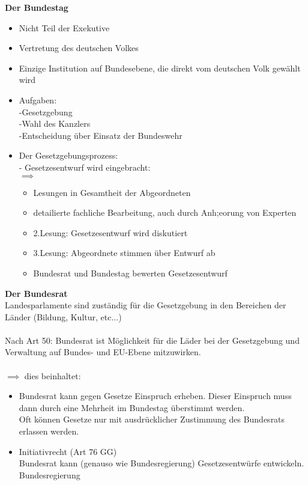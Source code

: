 \documentclass[12pt, letterpaper]{article}
\begin{document}
\begin{itemize}
\newpage
\textbf{Der Bundestag}
\begin{itemize}
  \item Nicht Teil der Exekutive
  \item Vertretung des deutschen Volkes
  \item Einzige Institution auf Bundesebene, die direkt vom deutschen Volk gewählt wird
  \item Aufgaben:\\
    -Gesetzgebung\\
    -Wahl des Kanzlers\\
    -Entscheidung über Einsatz der Bundeswehr\\

  \item Der Gesetzgebungsprozess:\\
    - Gesetzesentwurf wird eingebracht:\\
    $\implies$ \begin{itemize}
      \item Lesungen in Gesamtheit der Abgeordneten
      \item detailierte fachliche Bearbeitung, auch durch Anh;eorung von Experten
      \item 2.Lesung: Gesetzesentwurf wird diskutiert
      \item 3.Lesung: Abgeordnete stimmen über Entwurf ab
      \item Bundesrat und Bundestag bewerten Gesetzesentwurf
    \end{itemize}

\end{itemize}
\textbf{Der Bundesrat} 
\\
Landesparlamente sind zuständig für die Gesetzgebung in den Bereichen der Länder (Bildung, Kultur, etc...)
\\\\
Nach Art 50: Bundesrat ist Möglichkeit für die Läder bei der Gesetzgebung und Verwaltung auf Bundes- und EU-Ebene mitzuwirken.\\\\
$\implies$ dies beinhaltet: 
\begin{itemize}
  \item Bundesrat kann gegen Gesetze Einspruch erheben. Dieser Einspruch muss dann durch eine Mehrheit im Bundestag überstimmt werden.\\
    Oft können Gesetze nur mit ausdrücklicher Zustimmung des Bundesrats erlassen werden.
  \item Initiativrecht (Art 76 GG)\\
    Bundesrat kann (genauso wie Bundesregierung) Gesetzesentwürfe entwickeln.\\
    Bundesregierung



\end{itemize}
\end{itemize}
\end{document}
